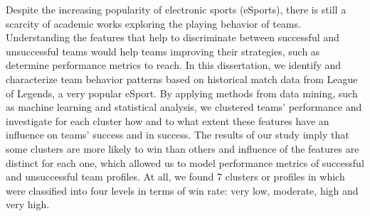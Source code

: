 Despite the increasing popularity of electronic sports (eSports), there is still a scarcity of academic works exploring the playing behavior of teams. Understanding the features that help to discriminate between successful and unsuccessful teams would help teams improving their strategies, such as determine performance metrics to reach. In this dissertation, we identify and characterize team behavior patterns based on historical match data from League of Legends, a very popular eSport. By applying methods from data mining, such as machine learning and statistical analysis, we clustered teams' performance and investigate for each cluster how and to what extent these features have an influence on teams'  success and in success. The results of our study imply that some clusters are more likely to win than others and influence of the features are distinct for each one, which allowed us to model performance metrics of successful and unsuccessful team profiles. At all, we found 7 clusters or profiles in which were classified into four levels in terms of win rate: very low, moderate, high and very high.
